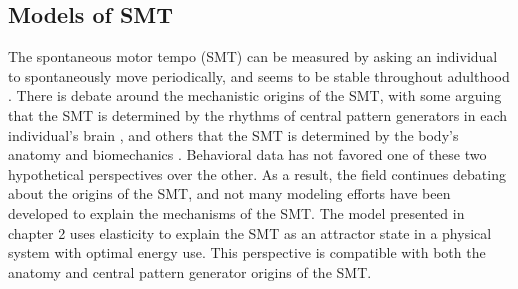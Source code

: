 \documentclass{report}
\begin{document}
\subsection{Models of SMT}
The spontaneous motor tempo (SMT) can be measured by asking an individual to spontaneously move periodically, and seems to be stable throughout adulthood \cite{scheurich2018tapping}. There is debate around the mechanistic origins of the SMT, with some arguing that the SMT is determined by the rhythms of central pattern generators in each individual's brain \cite{latash1992virtual}, and others that the SMT is determined by the body’s anatomy and biomechanics \cite{goodman2000advantages}. Behavioral data has not favored one of these two hypothetical perspectives over the other. As a result, the field continues debating about the origins of the SMT, and not many modeling efforts have been developed to explain the mechanisms of the SMT. The model presented in chapter 2 uses elasticity to explain the SMT as an attractor state in a physical system with optimal energy use. This perspective is compatible with both the anatomy and central pattern generator origins of the SMT. 
\end{document}

